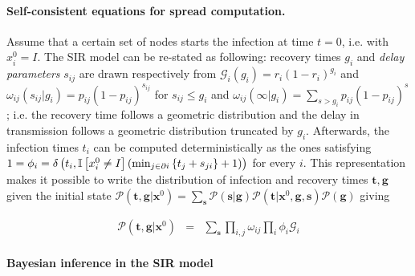\paragraph*{Self-consistent equations for spread computation.}

Assume that a certain set of nodes starts the infection at time $t=0$,
i.e. with $x_{i}^{0}=I$. The SIR model can be re-stated as following: recovery times $g_{i}$ and {\em delay parameters} $s_{ij}$ are drawn
respectively from $\mathcal{G}_{i}\left(g_{i}\right)=r_{i}\left(1-r_{i}\right)^{g_{i}}$
and $\omega_{ij}\left(s_{ij}|g_{i}\right)=p_{ij}\left(1-p_{ij}\right)^{s_{ij}}$ for $s_{ij}\leq g_i$ and $\omega_{ij}\left(\infty|g_i\right)=\sum_{s>g_i}p_{ij}\left(1-p_{ij}\right)^{s}$;
i.e. the recovery time follows a geometric distribution and the delay
in transmission follows a geometric distribution truncated by $g_{i}$.
Afterwards, the infection times $t_{i}$ can be computed deterministically
as the ones satisfying $1=\phi_{i}=\delta\left(t_{i},\mathbb I\left[x_{i}^{0}\neq I\right]\left(\min_{j\in\partial i}\left\{ t_{j}+s_{ji}\right\} +1\right)\right)$
for every $i$. This representation makes it possible to write the
distribution of infection and recovery times $\mathbf{t},\mathbf{g}$
given the initial state $\mathcal{P}\left(\mathbf{t},\mathbf{g}|\mathbf{x}^{0}\right)=\sum_{\mathbf{s}}\mathcal{P}\left(\mathbf{s}|\mathbf{g}\right)\mathcal{P}\left(\mathbf{t}|\mathbf{x}^{0},\mathbf{g},\mathbf{s}\right)\mathcal{P\left(\mathbf{g}\right)}$
giving

\begin{eqnarray}
\mathcal{P}\left(\mathbf{t},\mathbf{g}|\mathbf{x}^{0}\right) & = & \sum_{\mathbf{s}}\prod_{i,j}\omega_{ij}\prod_{i}\phi_{i}\mathcal{G}_{i}
	\label{eq:direct}
\end{eqnarray}



\paragraph*{Bayesian inference in the SIR model}

